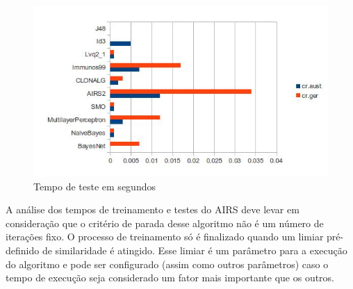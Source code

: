\begin{figure}[h]
    \centering
    \caption{Tempo de teste em segundos}
    \label{fig:dev_graph_test_time}
    \label{fig:dev_graph_last}
    \includegraphics[width=1\textwidth]{img/graph_test_time.jpg}
\end{figure}

A análise dos tempos de treinamento e testes do AIRS deve levar em consideração que o critério de parada desse algoritmo não é um número de iterações fixo. O processo de treinamento só é finalizado quando um limiar pré-definido de similaridade é atingido. Esse limiar é um parâmetro para a execução do algoritmo e pode ser configurado (assim como outros parâmetros) caso o tempo de execução seja considerado um fator mais importante que os outros.

